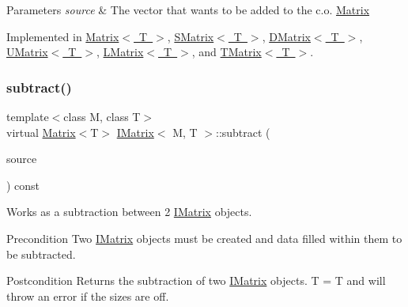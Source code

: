\begin{DoxyParams}{Parameters}
{\em source} & The vector that wants to be added to the c.\+o. \mbox{\hyperlink{class_matrix}{Matrix}} \\
\hline
\end{DoxyParams}


Implemented in \mbox{\hyperlink{class_matrix_af61aaa671b6bd354b27fb3aabbb65a9d}{Matrix$<$ T $>$}}, \mbox{\hyperlink{class_s_matrix_a245ee5844619467dd4ef2a3525a3aa52}{S\+Matrix$<$ T $>$}}, \mbox{\hyperlink{class_d_matrix_ad810420fa5ae11470778e4805c0df1c9}{D\+Matrix$<$ T $>$}}, \mbox{\hyperlink{class_u_matrix_a57003b0a0f3fe394ab04f9588732a928}{U\+Matrix$<$ T $>$}}, \mbox{\hyperlink{class_l_matrix_a3f82539f6b2251d49a2e39c7c359b92d}{L\+Matrix$<$ T $>$}}, and \mbox{\hyperlink{class_t_matrix_a24e6b8326823cba70691cfb92d73fc95}{T\+Matrix$<$ T $>$}}.

\mbox{\label{class_i_matrix_a0bf5046efed75799656059ce2980a851}} 
\subsubsection{\texorpdfstring{subtract()}{subtract()}}
{\footnotesize\ttfamily template$<$class M, class T$>$ \\
virtual \mbox{\hyperlink{class_matrix}{Matrix}}$<$T$>$ \mbox{\hyperlink{class_i_matrix}{I\+Matrix}}$<$ M, T $>$\+::subtract (\begin{DoxyParamCaption}\item[{const \mbox{\hyperlink{class_i_matrix}{I\+Matrix}}$<$ M, T $>$ \&}]{source }\end{DoxyParamCaption}) const\hspace{0.3cm}{\ttfamily [pure virtual]}}



Works as a subtraction between 2 \mbox{\hyperlink{class_i_matrix}{I\+Matrix}} objects. 

\begin{DoxyPrecond}{Precondition}
Two \mbox{\hyperlink{class_i_matrix}{I\+Matrix}} objects must be created and data filled within them to be subtracted. 
\end{DoxyPrecond}
\begin{DoxyPostcond}{Postcondition}
Returns the subtraction of two \mbox{\hyperlink{class_i_matrix}{I\+Matrix}} objects. T = T and will throw an error if the sizes are off.
\end{DoxyPostcond}

